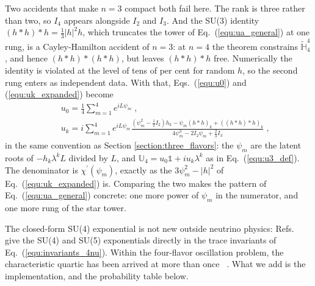\documentclass[final,5p,times,twocolumn]{elsarticle}
\newcommand{\eq}{Eq.}
\newcommand{\Refs}{Refs.}
\newcommand{\equ}[1]{\eq~(\ref{equ:#1})}
\providecommand{\DIFaddtex}[1]{{\protect\color{blue} \sf #1}} %
\providecommand{\DIFadd}[1]{\DIFaddtex{#1}} %
\begin{document}
\DIFadd{Two accidents that make $n=3$ compact both fail here.  The rank is three rather than two, so $I_4$ appears alongside $I_2$ and $I_3$.  And the SU(3) identity $\left(h \ast h\right) \ast h = \frac{1}{3}\lvert h \rvert^2 h$, which truncates the tower of \equ{ua_general} at one rung, is a Cayley-Hamilton accident of $n=3$: at $n=4$ the theorem constrains $\tilde{\mathbb{H}}_4^4$, and hence $(h \ast h) \ast (h \ast h)$, but leaves $(h \ast h) \ast h$ free.  Numerically the identity is violated at the level of tens of per cent for random $h$, so the second rung enters as independent data.  With that, Eqs.\ (\ref{equ:u0}) and (\ref{equ:uk_expanded}) become
}\begin{eqnarray}
 \label{equ:u0_4nu}
 && u_0 = \frac{1}{4}\sum_{m=1}^4 e^{iL\psi_m} \;, \\
 \label{equ:uk_4nu}
 && u_k
 =
 i\sum_{m=1}^4
 e^{iL\psi_m}
 \frac{\left(\psi_m^2 - \frac{1}{2}I_2\right)h_k - \psi_m \left(h \ast h\right)_k + \left(\left(h \ast h\right)\ast h\right)_k}{4\psi_m^3 - 2I_2\psi_m + \frac{2}{3}I_3} \;,
\end{eqnarray}
\DIFadd{in the same convention as Section \ref{section:three_flavors}: the $\psi_m$ are the latent roots of $-h_k\lambda^kL$ divided by $L$, and $\mathbb{U}_4 = u_0\mathbb{1} + iu_k\lambda^k$ as in \equ{u3_def}.  The denominator is $\chi^\prime(\psi_m)$, exactly as the $3\psi_m^2 - \lvert h \rvert^2$ of \equ{uk_expanded} is.  Comparing the two makes the pattern of \equ{ua_general} concrete: one more power of $\psi_m$ in the numerator, and one more rung of the star tower.
}

\DIFadd{The closed-form SU(4) exponential is not new outside neutrino physics: \Refs\ }\cite{VanKortryk:2015kua} \DIFadd{give the SU(4) and SU(5) exponentials directly in the trace invariants of \equ{invariants_4nu}.  Within the four-flavor oscillation problem, the characteristic quartic has been arrived at more than once\ }\cite{Kamo:2002sj}\DIFadd{.  What we add is the implementation, and the probability table below.
}
\end{document}
